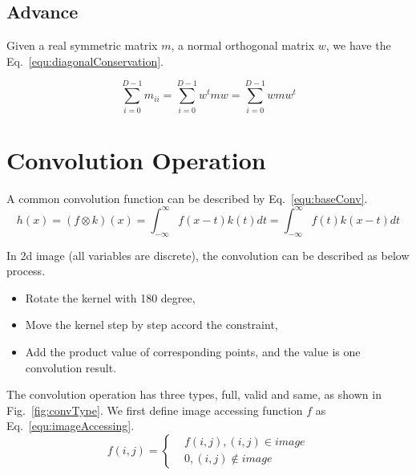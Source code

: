 \documentclass[runningheads,openany]{xhlPaper}
\begin{document}
\subsection{Advance}

\begin{theorem}
\label{the:diagonalConservation}
Given a real symmetric matrix $m$, a normal orthogonal matrix $w$, we have the Eq.~\ref{equ:diagonalConservation}.

\begin{equation}
\label{equ:diagonalConservation}
\sum\limits_{i = 0}^{D - 1} {{m_{ii}}}  = \sum\limits_{i = 0}^{D - 1} {{w^t}mw}  = \sum\limits_{i = 0}^{D - 1} {wm{w^t}} 
\end{equation}

\end{theorem}

\section{Convolution Operation}
A common convolution function can be described by Eq.~\ref{equ:baseConv}.
\begin{equation}
\label{equ:baseConv}
h(x) = (f \otimes k)(x) = \int_{ - \infty }^\infty  {f(x - t)k(t)dt = } \int_{ - \infty }^\infty  {f(t)k(x - t)dt}
\end{equation}

In 2d image (all variables are discrete), the convolution can be described as below process.
\begin{itemize}
  \item Rotate the kernel with 180 degree,
  \item Move the kernel step by step accord the constraint,
  \item Add the product value of corresponding points, and the value is one convolution result.
\end{itemize}

The convolution operation has three types, full, valid and same, as shown in Fig.~\ref{fig:convType}. We first define image accessing function $f$ as Eq.~\ref{equ:imageAccessing}.
\begin{equation}
\label{equ:imageAccessing}
f(i, j) = \left\{
\begin{aligned}
&f(i, j),(i, j) \in image\\
&0,(i, j) \notin image
\end{aligned}
\right.
\end{equation}
\end{document}
